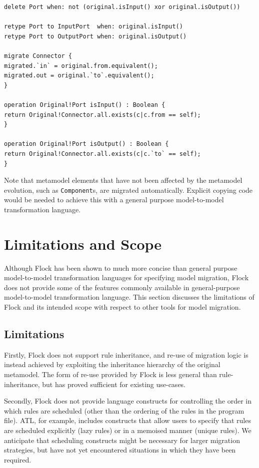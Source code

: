 \begin{lstlisting}[float=t,caption=Flock migration strategy for the process-oriented metamodel evolution in Figure~\ref{fig:po_mms}, label=lst:flock, language=Flock]
delete Port when: not (original.isInput() xor original.isOutput())

retype Port to InputPort  when: original.isInput()
retype Port to OutputPort when: original.isOutput()

migrate Connector {
migrated.`in` = original.from.equivalent();
migrated.out = original.`to`.equivalent();
}

operation Original!Port isInput() : Boolean {
return Original!Connector.all.exists(c|c.from == self);
}

operation Original!Port isOutput() : Boolean {
return Original!Connector.all.exists(c|c.`to` == self);
}
\end{lstlisting}


Note that metamodel elements that have not been affected by the metamodel evolution, such as \texttt{Co\-mp\-on\-e\-nt}s, are migrated automatically. Explicit copying code would be needed to achieve this with a general purpose model-to-model transformation language.

\section{Limitations and Scope}
Although Flock has been shown to much more concise than general purpose model-to-model transformation languages for specifying model migration, Flock does not provide some of the features commonly available in general-purpose model-to-model transformation language. This section discusses the limitations of Flock and its intended scope with respect to other tools for model migration.

\subsection{Limitations}
Firstly, Flock does not support rule inheritance, and re-use of migration logic is instead achieved by exploiting the inheritance hierarchy of the original metamodel. The form of re-use provided by Flock is less general than rule-inheritance, but has proved sufficient for existing use-cases.

Secondly, Flock does not provide language constructs for controlling the order in which rules are scheduled (other than the ordering of the rules in the program file). ATL, for example, includes constructs that allow users to specify that rules are scheduled explicitly (lazy rules) or in a memoised manner (unique rules). We anticipate that scheduling constructs might be necessary for larger migration strategies, but have not yet encountered situations in which they have been required.

